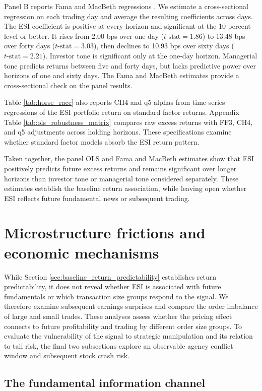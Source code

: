 \documentclass[12pt]{article}
\begin{document}
Panel B reports Fama and MacBeth regressions \citep{fama1973risk}. We estimate a cross-sectional regression on each trading day and average the resulting coefficients across days. The ESI coefficient is positive at every horizon and significant at the 10 percent level or better. It rises from 2.00 bps over one day ($t\text{-stat} = 1.86$) to 13.48 bps over forty days ($t\text{-stat} = 3.03$), then declines to 10.93 bps over sixty days ($t\text{-stat} = 2.21$). Investor tone is significant only at the one-day horizon. Managerial tone predicts returns between five and forty days, but lacks predictive power over horizons of one and sixty days. The Fama and MacBeth estimates provide a cross-sectional check on the panel results.

Table \ref{tab:horse_race} also reports CH4 and q5 alphas from time-series regressions of the ESI portfolio return on standard factor returns. Appendix Table \ref{tab:ols_robustness_matrix} compares raw excess returns with FF3, CH4, and q5 adjustments across holding horizons. These specifications examine whether standard factor models absorb the ESI return pattern.

Taken together, the panel OLS and Fama and MacBeth estimates show that ESI positively predicts future excess returns and remains significant over longer horizons than investor tone or managerial tone considered separately. These estimates establish the baseline return association, while leaving open whether ESI reflects future fundamental news or subsequent trading.

\section{Microstructure frictions and economic mechanisms}\label{sec:mechanisms}

While Section \ref{sec:baseline_return_predictability} establishes return predictability, it does not reveal whether ESI is associated with future fundamentals or which transaction size groups respond to the signal. We therefore examine subsequent earnings surprises and compare the order imbalance of large and small trades. These analyses assess whether the pricing effect connects to future profitability and trading by different order size groups. To evaluate the vulnerability of the signal to strategic manipulation and its relation to tail risk, the final two subsections explore an observable agency conflict window and subsequent stock crash risk.

\subsection{The fundamental information channel}\label{sec:fundamental_channel}
\end{document}
